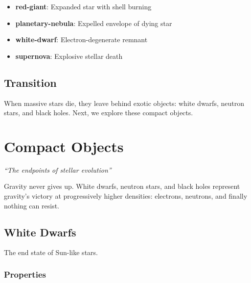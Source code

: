 \documentclass[
  11pt,
  letterpaper,
  twoside,
  openright]{book}
\providecommand{\tightlist}{%
  \setlength{\itemsep}{0pt}\setlength{\parskip}{0pt}}
\begin{document}
\begin{itemize}
\tightlist
\item
  \textbf{red-giant}: Expanded star with shell burning
\item
  \textbf{planetary-nebula}: Expelled envelope of dying star
\item
  \textbf{white-dwarf}: Electron-degenerate remnant
\item
  \textbf{supernova}: Explosive stellar death
\end{itemize}

\section{Transition}\label{transition-22}

When massive stars die, they leave behind exotic objects: white dwarfs,
neutron stars, and black holes. Next, we explore these compact objects.

\chapter{Compact Objects}\label{sec-compact-objects}

\emph{``The endpoints of stellar evolution''}

\begin{tcolorbox}[enhanced jigsaw, coltitle=black, colbacktitle=quarto-callout-note-color!10!white, toprule=.15mm, colframe=quarto-callout-note-color-frame, arc=.35mm, opacityback=0, bottomtitle=1mm, toptitle=1mm, breakable, colback=white, titlerule=0mm, opacitybacktitle=0.6, title=\textcolor{quarto-callout-note-color}{\faInfo}\hspace{0.5em}{Key Revelation}, rightrule=.15mm, bottomrule=.15mm, leftrule=.75mm, left=2mm]

Gravity never gives up. White dwarfs, neutron stars, and black holes
represent gravity's victory at progressively higher densities:
electrons, neutrons, and finally nothing can resist.

\end{tcolorbox}

\section{White Dwarfs}\label{white-dwarfs}

The end state of Sun-like stars.

\subsection{Properties}\label{properties-11}
\end{document}
